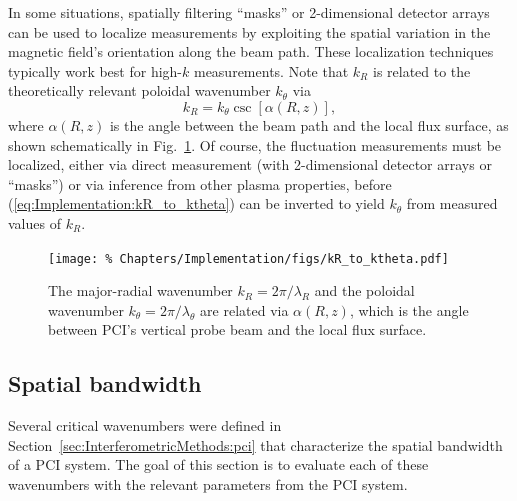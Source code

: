 In some situations, spatially filtering ``masks''
\cite{dorris_rsi09, dorris_phd, lin_rsi06} or
2-dimensional detector arrays
\cite{sanin_rsi04, tanaka_rsi16}
can be used to localize measurements
by exploiting the spatial variation
in the magnetic field's orientation along the beam path.
These localization techniques typically work best
for high-$k$ measurements.
Note that $k_R$ is related to the
theoretically relevant poloidal wavenumber $k_{\theta}$ via
\begin{equation}
  k_R = k_{\theta} \csc[\alpha(R, z)],
  \label{eq:Implementation:kR_to_ktheta}
\end{equation}
where $\alpha(R, z)$ is the angle
between the beam path and the local flux surface,
as shown schematically in
Fig.~\ref{fig:Implementation:relating_kR_to_ktheta}.
Of course, the fluctuation measurements must be localized,
either via direct measurement
(with 2-dimensional detector arrays or ``masks'')
or via inference from other plasma properties,
before (\ref{eq:Implementation:kR_to_ktheta})
can be inverted to yield $k_{\theta}$
from measured values of $k_R$.

\begin{figure}
  \centering
  \texttt{[image: \%
    Chapters/Implementation/figs/kR\_to\_ktheta.pdf]}
  \caption[Relating $k_R$ to $k_{\theta}$]{%
    The major-radial wavenumber $k_R = 2 \pi / \lambda_R$ and
    the poloidal wavenumber $k_{\theta} = 2 \pi / \lambda_{\theta}$
    are related via $\alpha(R, z)$, which
    is the angle between PCI's vertical probe beam and
    the local flux surface.}
\label{fig:Implementation:relating_kR_to_ktheta}
\end{figure}


\subsection{Spatial bandwidth}
Several critical wavenumbers were defined in
Section~\ref{sec:InterferometricMethods:pci} that
characterize the spatial bandwidth of a PCI system.
The goal of this section is to evaluate each of these
wavenumbers with the relevant parameters from
the \diiid \space PCI system.

